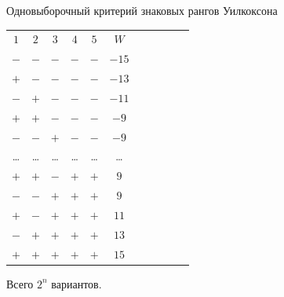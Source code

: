 \documentclass[9pt,pdf,utf8,hyperref={unicode},aspectratio=169]{beamer}
\begin{document}
\begin{frame}[label=signrank1]{\hyperlink{classification}{} Одновыборочный критерий знаковых рангов Уилкоксона}
{    \begin{center}  \setlength{\tabcolsep}{5pt}
        \begin{tabular}{c c c c c c c c c c c}
        $1$&$2$&$3$&$4$&$5$&$W$\\
        $-$&$-$&$-$&$-$&$-$&$-15$\\
        $+$&$-$&$-$&$-$&$-$&$-13$\\
        $-$&$+$&$-$&$-$&$-$&$-11$\\
        $+$&$+$&$-$&$-$&$-$&$-9$\\
        $-$&$-$&$+$&$-$&$-$&$-9$\\
        \dots&\dots&\dots&\dots&\dots&\dots\\
         $+$&$+$&$-$&$+$&$+$&$9$\\
        $-$&$-$&$+$&$+$&$+$&$9$\\
        $+$&$-$&$+$&$+$&$+$&$11$\\
        $-$&$+$&$+$&$+$&$+$&$13$\\
        $+$&$+$&$+$&$+$&$+$&$15$\\
        \end{tabular}
    \end{center}
    
    Всего $2^n$ вариантов.
 }
\end{frame}
\end{document}
